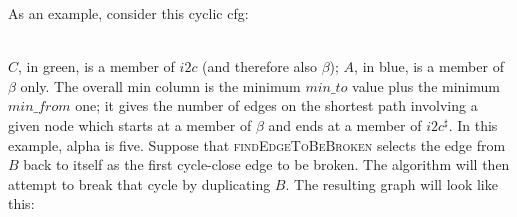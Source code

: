 As an example, consider this cyclic \gls{cfg}:\\
\centerline{
}\\
$C$, in green, is a member of $i2c$ (and therefore also $\beta$); $A$,
in blue, is a member of $\beta$ only.  The overall min column is the
minimum $\mathit{min\_to}$ value plus the minimum $\mathit{min\_from}$
one; it gives the number of edges on the shortest path involving a
given node which starts at a member of $\beta$ and ends at a member of
$i2c^\sharp$.  In this example, \gls{alpha} is five.  Suppose that
\textsc{findEdgeToBeBroken} selects the edge from $B$ back to itself
as the first cycle-close edge to be broken.  The algorithm will then
attempt to break that cycle by duplicating $B$.  The resulting graph
will look like this:

